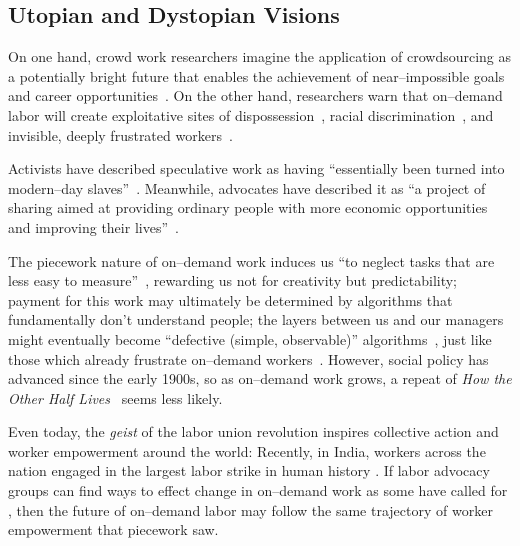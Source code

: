 \documentclass[trackingWork]{subfiles}
\begin{document}
\subsection{Utopian and Dystopian Visions}\label{sec:polarizationOfCrowdWork}
On one hand, crowd work researchers
imagine the application of crowdsourcing as
a potentially bright future that enables the achievement of near--impossible goals and career opportunities~\cite{redballoon,crowdworkFuture,vizwiz,suzukiAtelier}.
On the other hand, researchers
warn that on--demand labor will create exploitative sites of dispossession~\cite{scholz2012digital},
racial discrimination~\cite{edelman2015racial},
and invisible, deeply frustrated workers~\cite{turkopticon,bighamHalfWorkday}.

Activists have described speculative work as having
``essentially been turned into modern--day slaves''~\cite{activistsHuffPoLawsuit}.
Meanwhile, advocates have described it as
``a project of sharing aimed at providing ordinary people with more economic opportunities and improving their lives''~\cite{uberPropaganda}.

The piecework nature of on--demand work induces us
``to neglect tasks that are less easy to measure''~\cite{SJOE:SJOE371},
rewarding us not for creativity but predictability;
payment for this work may ultimately be determined by
algorithms that fundamentally don't understand people;
the layers between us and our managers might eventually become
``defective (simple, observable)'' algorithms~\cite{10.2307/2555446},
just like those which already frustrate
on--demand workers~\cite{uberAlgorithm,dynamo,turkopticon}.
However, social policy has advanced since the early 1900s, so as on--demand work grows, a repeat of \textit{How the Other Half Lives}~\cite{riisOtherSideLives} seems less likely.

Even today, the \textit{geist} of the labor union revolution
inspires collective action and worker empowerment around the world:
Recently, in India, workers across the nation engaged in
the largest labor strike in human history
\cite{indiaStrikeRealNews}.
If labor advocacy groups can find ways to effect change in on--demand work as some have called for
\cite{futureUnions},
then the future of on--demand labor may follow
the same trajectory of worker empowerment that piecework saw.
\end{document}
